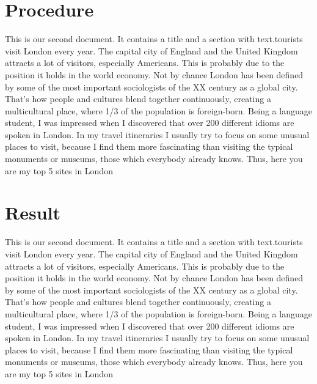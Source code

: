 \documentclass[a4paper,11pt]{ctexart}
\begin{document}
\section{Procedure}
This is our second document. It contains a title and a 
section with text.tourists visit London every year. The capital city of England and the United Kingdom attracts a lot of visitors, especially Americans. This is probably due to the position it holds in the world economy.
Not by chance London has been defined by some of the most important sociologists of the XX century as a global city. That’s how people and cultures blend together continuously, creating a multicultural place, where 1/3 of the population is foreign-born. Being a language student, I was impressed when I discovered that over 200 different idioms are spoken in London.
In my travel itineraries I usually try to focus on some unusual places to visit, because I find them more fascinating than visiting the typical monuments or museums, those which everybody already knows. Thus, here you are my top 5 sites in London

\section{Result}
This is our second document. It contains a title and a 
section with text.tourists visit London every year. The capital city of England and the United Kingdom attracts a lot of visitors, especially Americans. This is probably due to the position it holds in the world economy.
Not by chance London has been defined by some of the most important sociologists of the XX century as a global city. That’s how people and cultures blend together continuously, creating a multicultural place, where 1/3 of the population is foreign-born. Being a language student, I was impressed when I discovered that over 200 different idioms are spoken in London.
In my travel itineraries I usually try to focus on some unusual places to visit, because I find them more fascinating than visiting the typical monuments or museums, those which everybody already knows. Thus, here you are my top 5 sites in London
\end{document}
